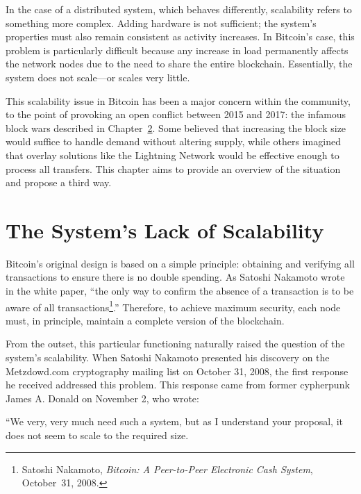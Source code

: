 \documentclass[
  a5paper,
  smalldemyvopaper,10pt,twoside,onecolumn,openright,extrafontsizes,hidelinks]{memoir}
\begin{document}
In the case of a distributed system, which behaves differently,
scalability refers to something more complex. Adding hardware is not
sufficient; the system's properties must also remain consistent as
activity increases. In Bitcoin's case, this problem is particularly
difficult because any increase in load permanently affects the network
nodes due to the need to share the entire blockchain. Essentially, the
system does not scale---or scales very little.

This scalability issue in Bitcoin has been a major concern within the
community, to the point of provoking an open conflict between 2015 and
2017: the infamous block wars described in
Chapter~\hyperref[ch:clivages]{2}. Some believed that increasing the
block size would suffice to handle demand without altering supply, while
others imagined that overlay solutions like the Lightning Network would
be effective enough to process all transfers. This chapter aims to
provide an overview of the situation and propose a third way.

\section*{The System's Lack of
Scalability}\label{the-system-s-lack-of-scalability}


Bitcoin's original design is based on a simple principle: obtaining and
verifying all transactions to ensure there is no double spending. As
Satoshi Nakamoto wrote in the white paper, ``the only way to confirm the
absence of a transaction is to be aware of all
transactions\footnote{Satoshi Nakamoto, \emph{Bitcoin: A Peer-to-Peer
  Electronic Cash System}, October~31, 2008.}.'' Therefore, to achieve
maximum security, each node must, in principle, maintain a complete
version of the blockchain.

From the outset, this particular functioning naturally raised the
question of the system's scalability. When Satoshi Nakamoto presented
his discovery on the Metzdowd.com cryptography mailing list on October
31, 2008, the first response he received addressed this problem. This
response came from former cypherpunk James A. Donald on November 2, who
wrote:

``We very, very much need such a system, but as I understand your
proposal, it does not seem to scale to the required size.
\end{document}
